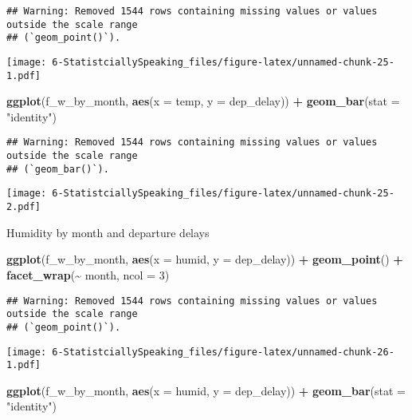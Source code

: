 \documentclass[
]{article}
\newenvironment{Shaded}{\begin{snugshade}}{\end{snugshade}}
\newcommand{\AttributeTok}[1]{\textcolor[rgb]{0.13,0.29,0.53}{#1}}
\newcommand{\DecValTok}[1]{\textcolor[rgb]{0.00,0.00,0.81}{#1}}
\newcommand{\FunctionTok}[1]{\textcolor[rgb]{0.13,0.29,0.53}{\textbf{#1}}}
\newcommand{\NormalTok}[1]{#1}
\newcommand{\SpecialCharTok}[1]{\textcolor[rgb]{0.81,0.36,0.00}{\textbf{#1}}}
\newcommand{\StringTok}[1]{\textcolor[rgb]{0.31,0.60,0.02}{#1}}
\begin{document}
\begin{verbatim}
## Warning: Removed 1544 rows containing missing values or values outside the scale range
## (`geom_point()`).
\end{verbatim}

\texttt{[image: 6-StatistciallySpeaking\_files/figure-latex/unnamed-chunk-25-1.pdf]}

\begin{Shaded}
\begin{Highlighting}[]
\FunctionTok{ggplot}\NormalTok{(f\_w\_by\_month, }\FunctionTok{aes}\NormalTok{(}\AttributeTok{x =}\NormalTok{ temp, }\AttributeTok{y =}\NormalTok{ dep\_delay)) }\SpecialCharTok{+}
  \FunctionTok{geom\_bar}\NormalTok{(}\AttributeTok{stat =} \StringTok{"identity"}\NormalTok{)}
\end{Highlighting}
\end{Shaded}

\begin{verbatim}
## Warning: Removed 1544 rows containing missing values or values outside the scale range
## (`geom_bar()`).
\end{verbatim}

\texttt{[image: 6-StatistciallySpeaking\_files/figure-latex/unnamed-chunk-25-2.pdf]}

Humidity by month and departure delays

\begin{Shaded}
\begin{Highlighting}[]
\FunctionTok{ggplot}\NormalTok{(f\_w\_by\_month, }\FunctionTok{aes}\NormalTok{(}\AttributeTok{x =}\NormalTok{ humid, }\AttributeTok{y =}\NormalTok{ dep\_delay)) }\SpecialCharTok{+} 
  \FunctionTok{geom\_point}\NormalTok{() }\SpecialCharTok{+}
  \FunctionTok{facet\_wrap}\NormalTok{(}\SpecialCharTok{\textasciitilde{}}\NormalTok{ month, }\AttributeTok{ncol =} \DecValTok{3}\NormalTok{)}
\end{Highlighting}
\end{Shaded}

\begin{verbatim}
## Warning: Removed 1544 rows containing missing values or values outside the scale range
## (`geom_point()`).
\end{verbatim}

\texttt{[image: 6-StatistciallySpeaking\_files/figure-latex/unnamed-chunk-26-1.pdf]}

\begin{Shaded}
\begin{Highlighting}[]
\FunctionTok{ggplot}\NormalTok{(f\_w\_by\_month, }\FunctionTok{aes}\NormalTok{(}\AttributeTok{x =}\NormalTok{ humid, }\AttributeTok{y =}\NormalTok{ dep\_delay)) }\SpecialCharTok{+}
  \FunctionTok{geom\_bar}\NormalTok{(}\AttributeTok{stat =} \StringTok{"identity"}\NormalTok{)}
\end{Highlighting}
\end{Shaded}
\end{document}
